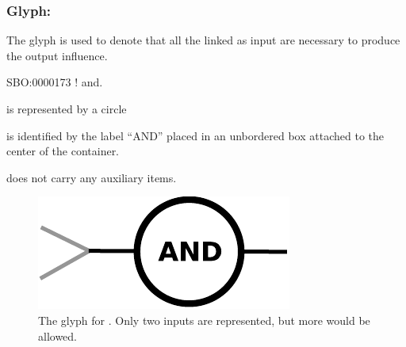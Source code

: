 \color{blue}
\subsubsection{Glyph: }\label{sec:and}

The glyph  is used to denote that all the  linked as input are necessary to produce the output influence.

\begin{glyphDescription}

 \glyphSboTerm SBO:0000173 ! and.

 \glyphContainer {} is represented by a circle

  \glyphLabel {} is identified by the label ``AND'' placed in an unbordered box attached to the center of the container. 

  \glyphAux {} does not carry any auxiliary items.

\end{glyphDescription}


\begin{figure}[H]
  \centering
  \includegraphics[scale = 0.5]{images/and}
  \caption{The \ER glyph for . Only two inputs are represented, but more would be allowed.}
  \label{fig:and}
\end{figure}


%
\normalcolor
